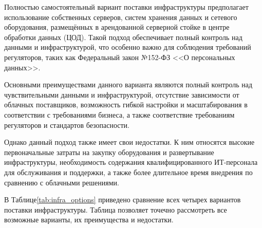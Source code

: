 \documentclass[14pt, a4paper]{extarticle}
\begin{document}
Полностью самостоятельный вариант поставки инфраструктуры предполагает использование собственных серверов, систем хранения данных и сетевого оборудования, размещённых в арендованной серверной стойке в центре обработки данных (ЦОД). Такой подход обеспечивает полный контроль над данными и инфраструктурой, что особенно важно для соблюдения требований регуляторов, таких как Федеральный закон №152-ФЗ <<О персональных данных>>.

Основными преимуществами данного варианта являются полный контроль над чувствительными данными и инфраструктурой, отсутствие зависимости от облачных поставщиков, возможность гибкой настройки и масштабирования в соответствии с требованиями бизнеса, а также соответствие требованиям регуляторов и стандартов безопасности.

Однако данный подход также имеет свои недостатки. К ним относятся высокие первоначальные затраты на закупку оборудования и развертывание инфраструктуры, необходимость содержания квалифицированного ИТ-персонала для обслуживания и поддержки, а также более длительное время внедрения по сравнению с облачными решениями.

В Таблице\;\ref{tab:infra_options} приведено сравнение всех четырех вариантов поставки
инфраструктуры. Таблица позволяет точечно рассмотреть все возможные варианты, их
преимущества и недостатки.
\end{document}
